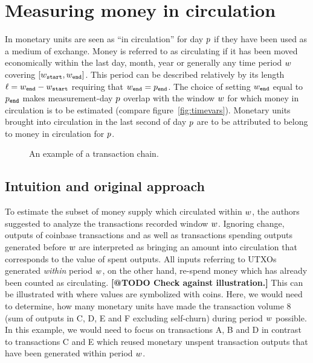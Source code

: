 \section{Measuring money in circulation}
\label{sec:measure}%

In \cite{pernice2019cryptocurrencies} monetary units are seen as ``in circulation'' for day \({p}\)
if they have been used as a medium of exchange. %
Money is referred to as circulating if it has been moved economically within the last day, month, year or generally any time period ${w}$ covering $[{w}_{\mathtt{start}} , {w}_{\mathtt{end}}]$. %
This period can be described relatively by its length \({\ell} = {w}_{\mathtt{end}}-{w}_{\mathtt{start}}\) requiring that \({w}_{\mathtt{end}} = {p}_{{\mathtt{end}}}\). %
The choice of setting \({w}_{\mathtt{end}}\) equal to \({p}_{{\mathtt{end}}}\)  makes measurement-day \({p}\) overlap with the window \({w}\) for which money in circulation is to be estimated (compare figure~\ref{fig:timevars}). %
Monetary units brought into circulation in the last second of day \({p}\) are to be attributed to belong to money in circulation for \({p}\). %

\begin{figure}[ht!]%
	\centering
	\ifdefined\varInputFigs%
	
	\else%
	\fi%
	\caption{%
		An example of a transaction chain. %
	}%
	\label{fig:mcirc_concept}%
\end{figure}%


\subsection{Intuition and original approach}
\label{sec:orig_approach}%
To estimate the subset of money supply which circulated within ${w}$, the authors suggested to analyze the transactions recorded window ${w}$.  %
Ignoring change, outputs of coinbase transactions and as well as transactions spending outputs generated before ${w}$ are interpreted as bringing an amount into circulation that corresponds to the value of spent outputs.  %
All inputs referring to UTXOs generated \emph{within} period ${w}$, on the
other hand, re-spend money which has already been counted as circulating.%
%
\textbf{[@TODO Check against illustration.]}
This can be illustrated with  where values are symbolized with coins. %
Here, we would need to determine, how many monetary units have made the transaction volume $8$ (sum of outputs in C, D, E and F excluding self-churn) during period ${w}$ possible. %
In this example, we would need to focus on transactions A, B and D in contrast to transactions C and E which reused monetary unspent transaction outputs that have been generated within period ${w}$. %

